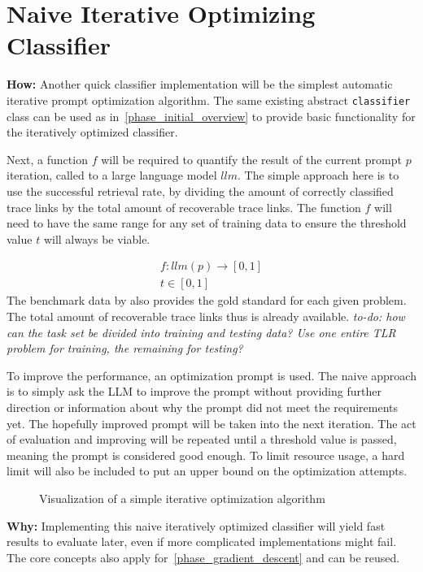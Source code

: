 \section{Naive Iterative Optimizing Classifier}
\label{approach:sec:naive_iterative}
\textbf{How:} Another quick classifier implementation will be the simplest automatic iterative prompt optimization algorithm.
The same existing abstract \verb|classifier| class can be used as in~\ref{phase_initial_overview} to provide basic functionality for the iteratively optimized classifier.

Next, a function $f$ will be required to quantify the result of the current prompt $p$ iteration, called to a large language model $llm$.
The simple approach here is to use the successful retrieval rate, by dividing the amount of correctly classified trace links by the total amount of recoverable trace links.
The function $f$ will need to have the same range for any set of training data to ensure the threshold value $t$ will always be viable.


\begin{align*}
    f: llm(p) \rightarrow [0, 1] \\
    t \in [0, 1]
\end{align*}
The benchmark data by  also provides the gold standard for each given problem.
The total amount of recoverable trace links thus is already available. \textit{to-do: how can the task set be divided into training and testing data? Use one entire TLR problem for training, the remaining for testing?}

To improve the performance, an optimization prompt is used.
The naive approach is to simply ask the LLM to improve the prompt without providing further direction or information about why the prompt did not meet the requirements yet.
The hopefully improved prompt will be taken into the next iteration.
The act of evaluation and improving will be repeated until a threshold value is passed, meaning the prompt is considered good enough.
To limit resource usage, a hard limit will also be included to put an upper bound on the optimization attempts.

\begin{figure}
    \centering
    
    \caption{Visualization of a simple iterative optimization algorithm}
    \label{fig:iterative_core_loop}
\end{figure}

\textbf{Why:} Implementing this naive iteratively optimized classifier will yield fast results to evaluate later, even if more complicated implementations might fail.
The core concepts also apply for~\ref{phase_gradient_descent} and can be reused.


